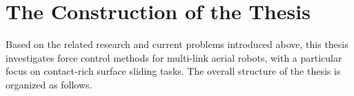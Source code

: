 

\section{The Construction of the Thesis}

Based on the related research and current problems introduced above, this thesis investigates force control methods for multi-link aerial robots, with a particular focus on contact-rich surface sliding tasks. The overall structure of the thesis is organized as follows.

